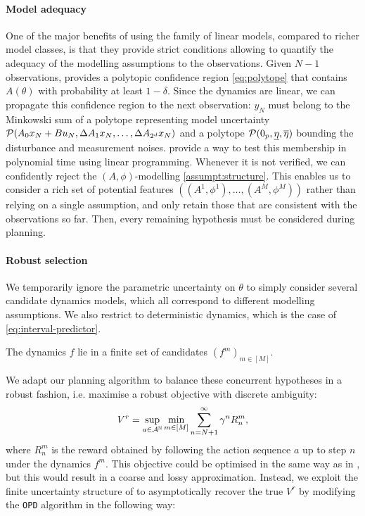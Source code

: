 \documentclass{article}
\begin{document}
\paragraph{Model adequacy}
One of the major benefits of using the family of linear models, compared to richer model classes, is that they provide strict conditions allowing to quantify the adequacy of the modelling assumptions to the observations.
Given $N-1$ observations,  provides a polytopic confidence region \eqref{eq:polytope} that contains $A(\theta)$ with probability at least $1-\delta$. Since the dynamics are linear, we can propagate this confidence region to the next observation: $y_{N}$ must belong to the Minkowski sum of a polytope representing model uncertainty $\mathcal{P}(A_{0} x_N + Bu_N, \Delta A_{1}x_N,\dots, \Delta A_{2^d}x_N)$ and a polytope $\mathcal{P}(0_p, \underline{\eta}, \overline{\eta})$ bounding the disturbance and measurement noises. \citet{delos2015} provide a way to test this membership in polynomial time using linear programming. Whenever it is not verified, we can confidently reject the $(A,\phi)$-modelling \cref{assumpt:structure}. This enables us to consider a rich set of potential features $\left((A^1, \phi^1), \dots, (A^M, \phi^M)\right)$ rather than relying on a single assumption, and only retain those that are consistent with the observations so far. Then, every remaining hypothesis must be considered during planning.

\paragraph{Robust selection}
We temporarily ignore the parametric uncertainty on $\theta$ to simply consider several candidate dynamics models, which all correspond to different modelling assumptions. We also restrict to deterministic dynamics, which is the case of \eqref{eq:interval-predictor}.

\begin{assumption}
\label{assumpt:multi-model-ambiguity}
The dynamics $f$ lie in a finite set of candidates $(f^m)_{m\in[M]}$.
\end{assumption}
We adapt our planning algorithm to balance these concurrent hypotheses in a robust fashion, i.e. maximise a robust objective with discrete ambiguity:
\begin{equation}
\label{eq:robust-objective-discrete}
V^r = \sup_{a\in\mathcal{A}^{\mathbb{N}}}\min_{m\in[M]} \sum_{n=N+1}^\infty \gamma^n R_n^m, 
\end{equation}
where $R_n^m$ is the reward obtained by following the action sequence $a$ up to step $n$ under the dynamics $f^m$.
This objective could be optimised in the same way as in , but this would result in a coarse and lossy approximation. Instead, we exploit the finite uncertainty structure of  to asymptotically recover the true $V^r$ by modifying the \texttt{OPD} algorithm in the following way:
\end{document}
